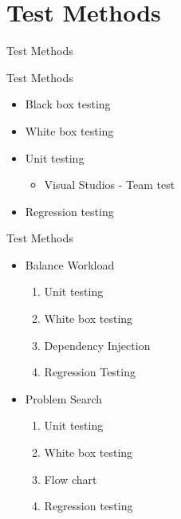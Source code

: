 \section{Test Methods}
\begin{frame}{Test Methods}
\end{frame}
\begin{frame}{Test Methods}
	\begin{itemize}
		\item Black box testing
		\item White box testing
		\item Unit testing
		\begin{itemize}
				\item Visual Studios - Team test
		\end{itemize}
		\item Regression testing
	\end{itemize}
\end{frame}

\begin{frame}{Test Methods}
	\begin{itemize}
		\item Balance Workload
			\begin{enumerate}
				\item Unit testing
				\item White box testing
				\item Dependency Injection
				\item Regression Testing
			\end{enumerate}
		\item Problem Search
		\begin{enumerate}
				\item Unit testing
				\item White box testing
			\item Flow chart
			\item Regression testing
		\end{enumerate}
	\end{itemize}
\end{frame}